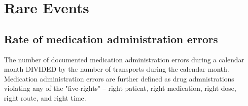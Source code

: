 \documentclass[twoside]{article}\usepackage[]{graphicx}\usepackage[]{color}
\makeatletter
\newenvironment{kframe}{%
 \def\at@end@of@kframe{}%
 \ifinner\ifhmode%
  \def\at@end@of@kframe{\end{minipage}}%
  \begin{minipage}{\columnwidth}%
 \fi\fi%
 \def\FrameCommand##1{\hskip\@totalleftmargin \hskip-\fboxsep
 \colorbox{shadecolor}{##1}\hskip-\fboxsep
     \hskip-\linewidth \hskip-\@totalleftmargin \hskip\columnwidth}%
 \MakeFramed {\advance\hsize-\width
   \@totalleftmargin\z@ \linewidth\hsize
   \@setminipage}}%
 {\par\unskip\endMakeFramed%
 \at@end@of@kframe}
\newenvironment{knitrout}{}{} %
\makeatother
\begin{document}
\begin{center}
\begin{knitrout}
\color{fgcolor}\begin{kframe}


{\ttfamily\noindent\bfseries\color{errorcolor}{\#\# Error: zero-length inputs cannot be mixed with those of non-zero length}}\end{kframe}
\end{knitrout}
\end{center}

\begin{kframe}


{\ttfamily\noindent\bfseries{}}\end{kframe}

\newpage
\section{Rare Events}
\subsection{Rate of medication administration errors}
The number of documented medication administration errors during a calendar month DIVIDED by the number of transports during the calendar month. Medication administration errors are further defined as drug admnistrations violating any of the "five-rights" -- right patient, right medication, right dose, right route, and right time.

\begin{center}
\begin{knitrout}
\color{fgcolor}\begin{kframe}


{\ttfamily\noindent\bfseries\color{errorcolor}{\#\# Error: zero-length inputs cannot be mixed with those of non-zero length}}\end{kframe}
\end{knitrout}
\end{center}

\begin{kframe}


{\ttfamily\noindent\bfseries{}}\end{kframe}
\end{document}
